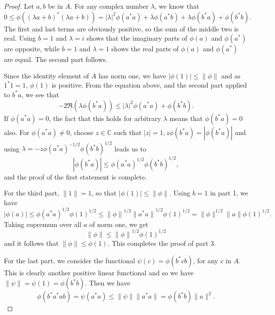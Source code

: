 \documentclass{book}
\begin{document}
\begin{proof}
  Let \(a,b\) be in \(A\). For any complex number \(\lambda\), we know that
  \[0 \leq\phi({(\lambda a+b)}^*(\lambda a+b)) = |\lambda|^2\phi(a^*a)+ \overline{\lambda}\phi(a^*b) + \lambda \phi(b^*a) + \phi(b^*b).\]
  The first and last terms are obviously positive, so the sum of the middle two
  is real. Using \(b = 1\) and \(\lambda = i\) shows that the imaginary parts of \(\phi(a)\) and
  \(\phi(a^*)\) are opposite, while \(b = 1\) and \(\lambda = 1\) shows the real parts of \(\phi(a)\) and
  \(\phi(a^*)\) are equal. The second part follows.\par
  Since the identity element of \(A\) has norm one, we have \(|\phi(1)| \leq \|\phi\|\) and
  as \(1^*1 = 1\), \(\phi(1)\) is positive. From the equation above, and the second part
  applied to \(b^*a\), we see that
  \[-2 \Re(\lambda\phi(b^*a)) \leq |\lambda|^2\phi(a^*a) + \phi(b^*b).\]
  If \(\phi(a^*a) = 0\), the fact that this holds for arbitrary \(\lambda\) means that \(\phi(b^*a) = 0\)
  also. For \(\phi(a^*a)\ne 0\), choose \(z \in \mathbb{C}\) such that \(|z| = 1, z\phi(b^*a) = |\phi(b^*a)|\) and
  using \(\lambda = -z{\phi(a^*a)}^{-1/2}{\phi(b^*b)}^{1/2}\) leads us to
  \[|\phi(b^*a)| \leq {\phi(a^*a)}^{1/2}{\phi(b^*b)}^{1/2},\]
  and the proof of the first statement is complete.\par
  For the third part, \(\|1\| = 1\), so that \(|\phi(1)| \leq \|\phi\|\). Using \(b = 1\) in part 1,
  we have
  \[|\phi(a)| \leq {\phi(a^*a)}^{1/2}\phi(1)^{1/2} \leq {\|\phi\|}^{1/2} {\|a^*a\|}^{1/2}{\phi(1)}^{1/2} = \|\phi\| ^{1/2} \|a\|{\phi(1)}^{1/2} .\]
  Taking supremum over all \(a\) of norm one, we get
  \[\|\phi\| \leq {\|\phi\|}^{1/2}{\phi(1)}^{1/2}\]
  and it follows that \(\|\phi\| \leq \phi(1)\). This completes the proof of part 3.\par
  For the last part, we consider the functional \(\psi(c) = \phi(b^*cb)\), for any
  \(c\) in \(A\). This is clearly another positive linear functional and so we have
  \(\|\psi\| =\psi(1)=\phi(b^*b)\). Then we have
  \[\phi(b^*a^*ab) = \psi(a^*a) \leq \|\psi\| \|a^*a\| = \phi(b^*b) \|a\|^2.\]
\end{proof}
\end{document}
